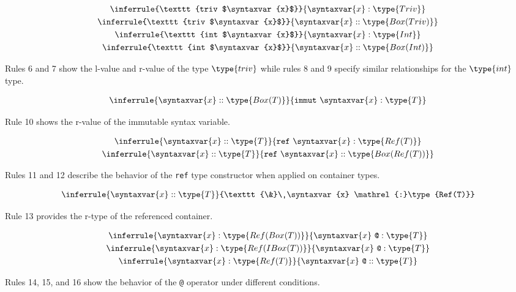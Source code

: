 \documentclass{article}
\newcommand\rtypeof{\mathrel{:}}
\newcommand\ltypeof{\mathrel{::}}
\newcommand{\syntax}{\texttt}
\begin{document}
\begin{gather}
  \inferrule{\syntax{triv $\syntaxvar{x}$}}{\syntaxvar{x} \rtypeof \type{Triv}}\\
  \inferrule{\syntax{triv $\syntaxvar{x}$}}{\syntaxvar{x} \ltypeof \type{Box(Triv)}}\\
  \inferrule{\syntax{int $\syntaxvar{x}$}}{\syntaxvar{x} \rtypeof \type{Int}}\\
  \inferrule{\syntax{int $\syntaxvar{x}$}}{\syntaxvar{x} \ltypeof \type{Box(Int)}}
\end{gather}

Rules 6 and 7 show the l-value and r-value of the type $\type{triv}$ while
rules 8 and 9 specify similar relationships for the $\type{int}$ type.

\begin{gather}
  \inferrule{\syntaxvar{x} \ltypeof \type{Box(T)}}{\syntax{immut}\ \syntaxvar{x} \rtypeof \type{T}}
\end{gather}

Rule 10 shows the r-value of the immutable syntax variable.

\begin{gather}
  \inferrule{\syntaxvar{x} \ltypeof \type{T}}{\syntax{ref}\ \syntaxvar{x} \rtypeof \type{Ref(T)}}\\
  \inferrule{\syntaxvar{x} \ltypeof \type{T}}{\syntax{ref}\ \syntaxvar{x} \ltypeof \type{Box(Ref(T))}}
\end{gather}

Rules 11 and 12 describe the behavior of the \syntax{ref} type constructor when
applied on container types.

\begin{gather}
  \inferrule{\syntaxvar{x} \ltypeof \type{T}}{\syntax{\&}\ \syntaxvar{x} \rtypeof \type{Ref(T)}}
\end{gather}

Rule 13 provides the r-type of the referenced container.

\begin{gather}
  \inferrule{\syntaxvar{x} \rtypeof \type{Ref(Box(T))}}{\syntaxvar{x}\ \syntax{@} \rtypeof \type{T}}\\
  \inferrule{\syntaxvar{x} \rtypeof \type{Ref(IBox(T))}}{\syntaxvar{x}\ \syntax{@} \rtypeof \type{T}}\\
  \inferrule{\syntaxvar{x} \rtypeof \type{Ref(T)}}{\syntaxvar{x}\ \syntax{@} \ltypeof \type{T}}
\end{gather}

Rules 14, 15, and 16 show the behavior of the \syntax{@} operator under
different conditions.
\end{document}
